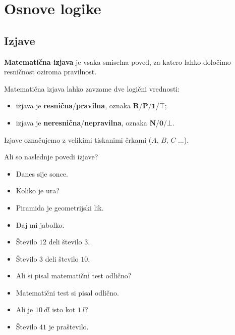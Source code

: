 \chapter{Osnove logike}

      
             \section{Izjave}

                \textbf{Matematična izjava} je vsaka smiselna poved, za katero 
                lahko določimo resničnost oziroma pravilnost.

                 
                Matematična izjava lahko zavzame dve logični vrednosti:
                \begin{itemize}
                    \item izjava je \textbf{resnična}/\textbf{pravilna}, 
                        oznaka $\mathbf{R}$/$\mathbf{P}$/$\mathbf{1}$/$\mathbf{\top}$;
                    \item izjava je \textbf{neresnična}/\textbf{nepravilna}, 
                        oznaka $\mathbf{N}$/$\mathbf{0}$/$\mathbf{\bot }$.
                \end{itemize}                

                 
                Izjave označujemo z velikimi tiskanimi črkami ($A$, $B$, $C$ ...).
             
         

         
             \begin{naloga}
                Ali so naslednje povedi izjave?
                \begin{itemize}   
                    \item Danes sije sonce.
                    \item Koliko je ura?
                    \item Piramida je geometrijski lik.
                    \item Daj mi jabolko.
                    \item Število $12$ deli število $3$.
                    \item Število $3$ deli število $10$.
                    \item Ali si pisal matematični test odlično?
                    \item Matematični test si pisal odlično.
                    \item Ali je $10~dl$ isto kot $1~l$?
                    \item Število $41$ je praštevilo.
                \end{itemize}
            \end{naloga}
             
